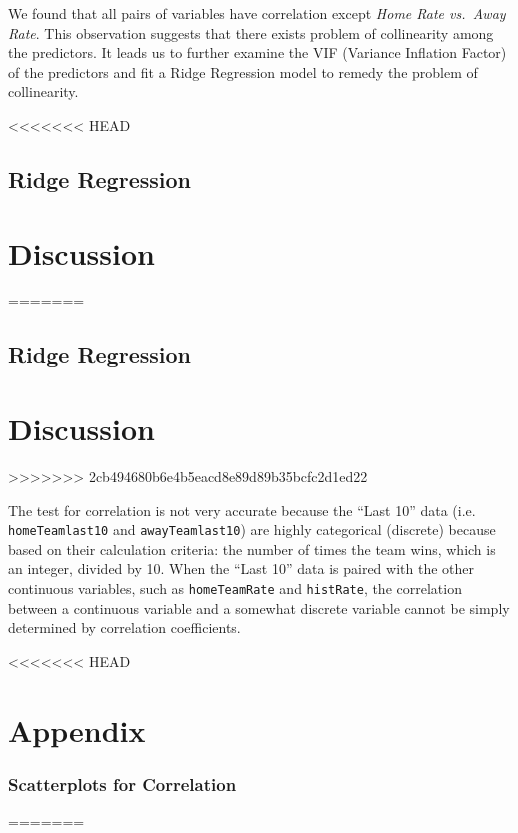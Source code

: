 \documentclass[]{article}
\begin{document}
We found that all pairs of variables have correlation except \emph{Home
Rate vs.~Away Rate}. This observation suggests that there exists problem
of collinearity among the predictors. It leads us to further examine the
VIF (Variance Inflation Factor) of the predictors and fit a Ridge
Regression model to remedy the problem of collinearity.

<<<<<<< HEAD
\hypertarget{ridge-regression-1}{%
\subsection{Ridge Regression}\label{ridge-regression-1}}

\hypertarget{discussion}{%
\section{Discussion}\label{discussion}}
=======
\subsection{Ridge Regression}\label{ridge-regression-1}

\section{Discussion}\label{discussion}
>>>>>>> 2cb494680b6e4b5eacd8e89d89b35bcfc2d1ed22

The test for correlation is not very accurate because the ``Last 10''
data (i.e. \texttt{homeTeamlast10} and \texttt{awayTeamlast10}) are
highly categorical (discrete) because based on their calculation
criteria: the number of times the team wins, which is an integer,
divided by 10. When the ``Last 10'' data is paired with the other
continuous variables, such as \texttt{homeTeamRate} and
\texttt{histRate}, the correlation between a continuous variable and a
somewhat discrete variable cannot be simply determined by correlation
coefficients.

\newpage

<<<<<<< HEAD
\hypertarget{appendix}{%
\section{Appendix}\label{appendix}}

\hypertarget{scatterplots-for-correlation}{%
\subsubsection{Scatterplots for
Correlation}\label{scatterplots-for-correlation}}
=======
\end{document}
